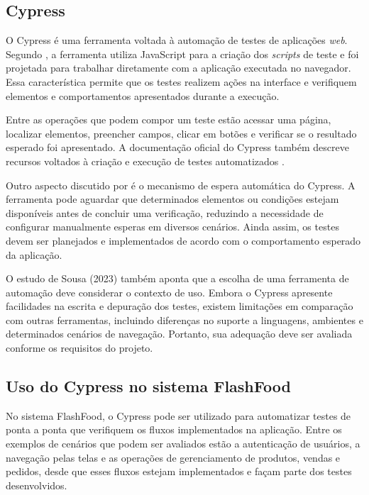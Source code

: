 \subsection{Cypress}

O Cypress é uma ferramenta voltada à automação de testes de aplicações \textit{web}. Segundo , a ferramenta utiliza JavaScript para a criação dos \textit{scripts} de teste e foi projetada para trabalhar diretamente com a aplicação executada no navegador. Essa característica permite que os testes realizem ações na interface e verifiquem elementos e comportamentos apresentados durante a execução.

Entre as operações que podem compor um teste estão acessar uma página, localizar elementos, preencher campos, clicar em botões e verificar se o resultado esperado foi apresentado. A documentação oficial do Cypress também descreve recursos voltados à criação e execução de testes automatizados \cite{cypress2023}.

Outro aspecto discutido por  é o mecanismo de espera automática do Cypress. A ferramenta pode aguardar que determinados elementos ou condições estejam disponíveis antes de concluir uma verificação, reduzindo a necessidade de configurar manualmente esperas em diversos cenários. Ainda assim, os testes devem ser planejados e implementados de acordo com o comportamento esperado da aplicação.

O estudo de Sousa (2023) também aponta que a escolha de uma ferramenta de automação deve considerar o contexto de uso. Embora o Cypress apresente facilidades na escrita e depuração dos testes, existem limitações em comparação com outras ferramentas, incluindo diferenças no suporte a linguagens, ambientes e determinados cenários de navegação. Portanto, sua adequação deve ser avaliada conforme os requisitos do projeto.

\subsection{Uso do Cypress no sistema FlashFood}

No sistema FlashFood, o Cypress pode ser utilizado para automatizar testes de ponta a ponta que verifiquem os fluxos implementados na aplicação. Entre os exemplos de cenários que podem ser avaliados estão a autenticação de usuários, a navegação pelas telas e as operações de gerenciamento de produtos, vendas e pedidos, desde que esses fluxos estejam implementados e façam parte dos testes desenvolvidos.

